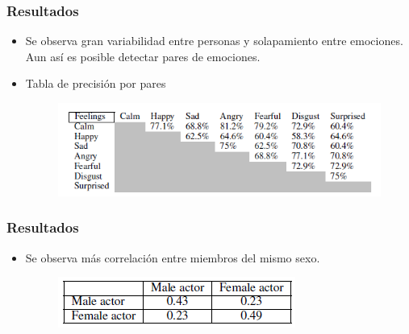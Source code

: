 \documentclass{beamer}
\begin{document}
\begin{frame}
\frametitle{Resultados}
\begin{itemize}
\item<1-> Se observa gran variabilidad entre personas y solapamiento entre emociones. Aun así es posible detectar pares de emociones.
\item<2-> Tabla de precisión por pares
\begin{figure}
\includegraphics[scale=0.7]{precision}
\end{figure}
\end{itemize}
\begin{figure}
\end{figure}
\end{frame}

\begin{frame}
\frametitle{Resultados}
\begin{itemize}
\item<1-> Se observa más correlación entre miembros del mismo sexo.
\begin{figure}
\includegraphics[scale=0.8]{sexos}
\end{figure}
\end{itemize}
\end{frame}
\end{document}
